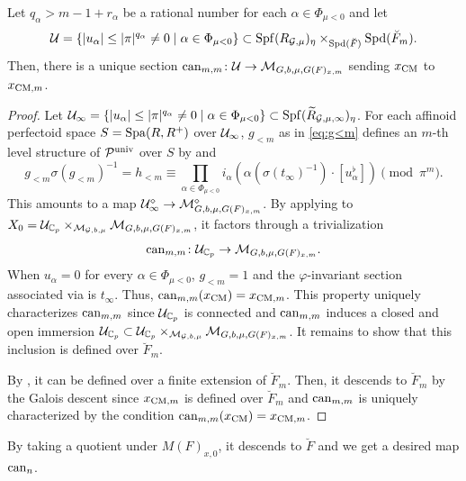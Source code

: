 \documentclass[12pt,reqno]{amsart}
\begin{document}
\begin{prop}  \label{prop:canmthtriv}
    Let $q_\alpha > m - 1 + r_\alpha$ be a rational number for each $\alpha \in \Phi_{\mu < 0}$ and let 
    \[
        {\mathcal{U}} = \{ \lvert u_\alpha \rvert \leq \lvert \pi \rvert^{q_\alpha} \neq 0 \mid \alpha \in \Phi_{\mu<0} \} \subset {\operatorname{Spf}}(R_{{\mathcal{G}},\mu})_\eta \times_{{\operatorname{Spd}}(\breve{F})} {\operatorname{Spd}}(\breve{F}_m). 
    \]
    Then, there is a unique section
    $
        {\operatorname{can}}_{m, m}\colon {\mathcal{U}}\to {\mathcal{M}}_{G, b, \mu, G(F)_{x, m}}
    $
    sending $x_{{\operatorname{CM}}}$ to $x_{{\operatorname{CM}}, m}$. 
\end{prop}
\begin{proof}
    Let ${\mathcal{U}}_\infty = \{ \lvert u_\alpha \rvert \leq \lvert \pi \rvert^{q_\alpha} \neq 0 \mid\alpha \in \Phi_{\mu<0} \} \subset {\operatorname{Spf}}({\widetilde{R}}_{{\mathcal{G}},\mu,\infty})_\eta$. For each affinoid perfectoid space $S = {\operatorname{Spa}}(R,R^+)$ over ${\mathcal{U}}_\infty$, $g_{<m}$ as in \eqref{eq:g<m} defines an $m$-th level structure of ${\mathcal{P}}^{\operatorname{univ}}$ over $S$ by  and
    \[
        g_{<m} \sigma(g_{<m})^{-1} = h_{<m} \equiv \prod_{\alpha \in \Phi_{\mu<0}} i_\alpha(\alpha(\sigma(t_\infty)^{-1})\cdot [u_\alpha^\flat]) \pmod{\pi^m}. 
    \]
    This amounts to a map ${\mathcal{U}}_\infty^\diamond \to {\mathcal{M}}_{G, b, \mu, G(F)_{x, m}}^\diamond$. By applying  to $X_0 = {\mathcal{U}}_{\mathbb{C}_p} \times_{{\mathcal{M}}_{{\mathcal{G}}, b, \mu}} {\mathcal{M}}_{G, b, \mu, G(F)_{x, m}}$, it factors through a trivialization 
    \[
        {\operatorname{can}}_{m, m}\colon {\mathcal{U}}_{\mathbb{C}_p} \to {\mathcal{M}}_{G, b, \mu, G(F)_{x, m}}. 
    \]
    When $u_{\alpha} = 0$ for every $\alpha \in \Phi_{\mu < 0}$, $g_{<m} = 1$ and the $\varphi$-invariant section associated via  is $t_\infty$. Thus, ${\operatorname{can}}_{m, m}(x_{\operatorname{CM}}) = x_{{\operatorname{CM}}, m}$. This property uniquely characterizes ${\operatorname{can}}_{m, m}$ since ${\mathcal{U}}_{\mathbb{C}_p}$ is connected and ${\operatorname{can}}_{m, m}$ induces a closed and open immersion ${\mathcal{U}}_{\mathbb{C}_p} \subset {\mathcal{U}}_{\mathbb{C}_p} \times_{{\mathcal{M}}_{{\mathcal{G}}, b, \mu}} {\mathcal{M}}_{G, b, \mu, G(F)_{x, m}}$. It remains to show that this inclusion is defined over $\breve{F}_m$. 
    
    By \cite[Lemma 11.22]{Sch17}, it can be defined over a finite extension of $\breve{F}_m$. Then, it descends to $\breve{F}_m$ by the Galois descent since $x_{{\operatorname{CM}}, m}$ is defined over $\breve{F}_m$ and ${\operatorname{can}}_{m, m}$ is uniquely characterized by the condition ${\operatorname{can}}_{m, m}(x_{\operatorname{CM}}) = x_{{\operatorname{CM}}, m}$.
\end{proof}

By taking a quotient under $M(F)_{x, 0}$, it descends to $\breve{F}$ and we get a desired map ${\operatorname{can}}_n$. 
\end{document}
